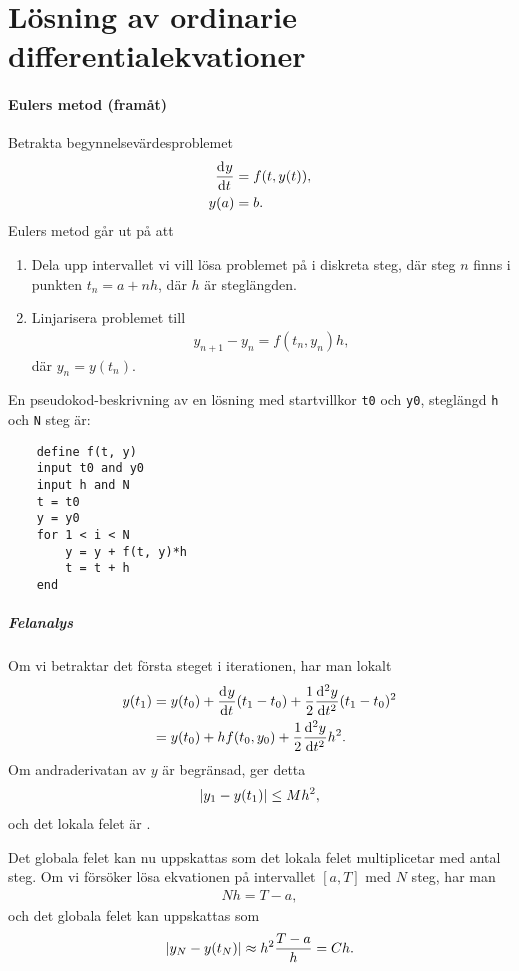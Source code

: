 \section{Lösning av ordinarie differentialekvationer}

\paragraph{Eulers metod (framåt)}
Betrakta begynnelsevärdesproblemet
\begin{align*}
	\dv[]{y}{t} (t) &= f(t, y(t)), \\
	y(a)            &= b.
\end{align*}
Eulers metod går ut på att
\begin{enumerate}
	\item Dela upp intervallet vi vill lösa problemet på i diskreta steg, där steg $n$ finns i punkten $t_{n} = a + nh$, där $h$ är steglängden.
	\item Linjarisera problemet till
	\begin{align*}
		y_{n + 1} - y_{n} = f(t_{n}, y_{n})h,
	\end{align*}
	där $y_{n} = y(t_{n})$.
\end{enumerate}

En pseudokod-beskrivning av en lösning med startvillkor \verb|t0| och \verb|y0|, steglängd \verb|h| och \verb|N| steg är:
\begin{lstlisting}
	define f(t, y)
	input t0 and y0
	input h and N
	t = t0
	y = y0
	for 1 < i < N
		y = y + f(t, y)*h
		t = t + h
	end
\end{lstlisting}

\subparagraph{Felanalys}
Om vi betraktar det första steget i iterationen, har man lokalt
\begin{align*}
	y(t_{1}) &= y(t_{0}) + \dv[]{y}{t} (t_{0})(t_{1} - t_{0}) + \frac{1}{2}\dv[2]{y}{t} (\alpha)(t_{1} - t_{0})^{2} \\
	         &= y(t_{0}) + hf(t_{0}, y_{0}) + \frac{1}{2}\dv[2]{y}{t} (\alpha)h^{2}.
\end{align*}
Om andraderivatan av $y$ är begränsad, ger detta
\begin{align*}
	\abs{y_{1} - y(t_{1})} \leq Mh^{2},
\end{align*}
och det lokala felet är .

Det globala felet kan nu uppskattas som det lokala felet multiplicetar med antal steg. Om vi försöker lösa ekvationen på intervallet $[a, T]$ med $N$ steg, har man
\begin{align*}
	Nh = T - a,
\end{align*}
och det globala felet kan uppskattas som
\begin{align*}
	\abs{y_{N} - y(t_{N})} \approx h^{2}\frac{T - a}{h} = Ch.
\end{align*}

